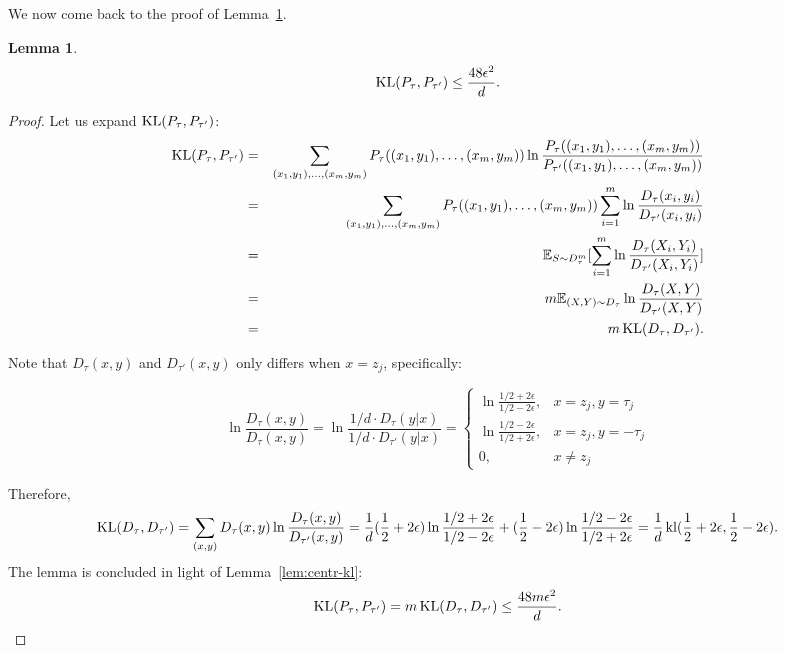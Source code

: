 \documentclass{article}
\newtheorem{lemma}{Lemma}
\DeclareMathOperator*{\kl}{{\rm kl}}
\DeclareMathOperator*{\KL}{{\rm KL}}
\newcommand{\EE}{\mathbb{E}}
\begin{document}
We now come back to the proof of Lemma~\ref{lem:kl-tau}.
\begin{lemma}
\[ \KL(P_{\tau}, P_{\tau'}) \leq \frac{48\epsilon^2}{d}. \]
\label{lem:kl-tau}
\end{lemma}
\begin{proof}
Let us expand $\KL(P_{\tau}, P_{\tau'})$:
\begin{eqnarray*}
  \KL(P_{\tau}, P_{\tau'})
  &=& \sum_{(x_1,y_1), \ldots, (x_m, y_m)} P_{\tau}((x_1,y_1), \ldots,(x_m, y_m))
  \ln\frac{P_{\tau}((x_1,y_1), \ldots,(x_m, y_m))}{P_{\tau'}((x_1,y_1), \ldots,(x_m, y_m))} \\
  &=& \sum_{(x_1,y_1), \ldots, (x_m, y_m)} P_{\tau}((x_1,y_1), \ldots,(x_m, y_m))
  \sum_{i=1}^m \ln\frac{D_\tau(x_i,y_i)}{D_{\tau'}(x_i, y_i)} \\
  &=& \EE_{S \sim D_\tau^m}[ \sum_{i=1}^m \ln\frac{D_\tau(X_i,Y_i)}{D_{\tau'}(X_i, Y_i)} ] \\
  &=& m \EE_{(X, Y) \sim D_\tau} \ln\frac{D_\tau(X,Y)}{D_{\tau'}(X, Y)} \\
  &=& m \KL(D_\tau, D_{\tau'}).
\end{eqnarray*}

Note that $D_\tau(x,y)$ and $D_{\tau'}(x,y)$ only differs when $x = z_j$, specifically:


\[
\ln \frac{D_\tau(x,y)}{D_\tau(x, y)} = \ln\frac{1/d \cdot D_\tau(y|x)}{1/d \cdot D_{\tau'}(y|x)} =
\begin{cases}
  \ln\frac{1/2+2\epsilon}{1/2-2\epsilon}, & x = z_j, y = \tau_j \\ \ln\frac{1/2-2\epsilon}{1/2+2\epsilon}, & x = z_j, y = -\tau_j \\
  0, & x \neq z_j \end{cases}
\]

Therefore,
\begin{eqnarray*}
  \KL(D_\tau, D_{\tau'})
  = \sum_{(x,y)} D_\tau(x,y) \ln\frac{D_\tau(x,y)}{D_{\tau'}(x,y)}
  = \frac{1}{d} (\frac12+2\epsilon) \ln\frac{1/2+2\epsilon}{1/2-2\epsilon} +
                (\frac12-2\epsilon) \ln\frac{1/2-2\epsilon}{1/2+2\epsilon}
  = \frac{1}{d} \kl(\frac12+2\epsilon, \frac12-2\epsilon).
\end{eqnarray*}
The lemma is concluded in light of Lemma~\ref{lem:centr-kl}:
\[ \KL(P_{\tau}, P_{\tau'}) = m \KL(D_\tau, D_{\tau'}) \leq \frac{48 m \epsilon^2}{d}. \]
\end{proof}
\end{document}
